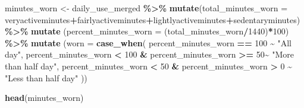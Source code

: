 \documentclass[
]{article}
\newenvironment{Shaded}{\begin{snugshade}}{\end{snugshade}}
\newcommand{\AttributeTok}[1]{\textcolor[rgb]{0.13,0.29,0.53}{#1}}
\newcommand{\DecValTok}[1]{\textcolor[rgb]{0.00,0.00,0.81}{#1}}
\newcommand{\FunctionTok}[1]{\textcolor[rgb]{0.13,0.29,0.53}{\textbf{#1}}}
\newcommand{\NormalTok}[1]{#1}
\newcommand{\OtherTok}[1]{\textcolor[rgb]{0.56,0.35,0.01}{#1}}
\newcommand{\SpecialCharTok}[1]{\textcolor[rgb]{0.81,0.36,0.00}{\textbf{#1}}}
\newcommand{\StringTok}[1]{\textcolor[rgb]{0.31,0.60,0.02}{#1}}
\begin{document}
\begin{Shaded}
\begin{Highlighting}[]
\NormalTok{minutes\_worn }\OtherTok{\textless{}{-}}\NormalTok{ daily\_use\_merged }\SpecialCharTok{\%\textgreater{}\%} 
  \FunctionTok{mutate}\NormalTok{(}\AttributeTok{total\_minutes\_worn =}\NormalTok{ veryactiveminutes}\SpecialCharTok{+}\NormalTok{fairlyactiveminutes}\SpecialCharTok{+}\NormalTok{lightlyactiveminutes}\SpecialCharTok{+}\NormalTok{sedentaryminutes)}\SpecialCharTok{\%\textgreater{}\%}
  \FunctionTok{mutate}\NormalTok{ (}\AttributeTok{percent\_minutes\_worn =}\NormalTok{ (total\_minutes\_worn}\SpecialCharTok{/}\DecValTok{1440}\NormalTok{)}\SpecialCharTok{*}\DecValTok{100}\NormalTok{) }\SpecialCharTok{\%\textgreater{}\%}
  \FunctionTok{mutate}\NormalTok{ (}\AttributeTok{worn =} \FunctionTok{case\_when}\NormalTok{(}
\NormalTok{    percent\_minutes\_worn }\SpecialCharTok{==} \DecValTok{100} \SpecialCharTok{\textasciitilde{}} \StringTok{"All day"}\NormalTok{,}
\NormalTok{    percent\_minutes\_worn }\SpecialCharTok{\textless{}} \DecValTok{100} \SpecialCharTok{\&}\NormalTok{ percent\_minutes\_worn }\SpecialCharTok{\textgreater{}=} \DecValTok{50}\SpecialCharTok{\textasciitilde{}} \StringTok{"More than half day"}\NormalTok{, }
\NormalTok{    percent\_minutes\_worn }\SpecialCharTok{\textless{}} \DecValTok{50} \SpecialCharTok{\&}\NormalTok{ percent\_minutes\_worn }\SpecialCharTok{\textgreater{}} \DecValTok{0} \SpecialCharTok{\textasciitilde{}} \StringTok{"Less than half day"}
\NormalTok{  ))}

\FunctionTok{head}\NormalTok{(minutes\_worn)}
\end{Highlighting}
\end{Shaded}
\end{document}
